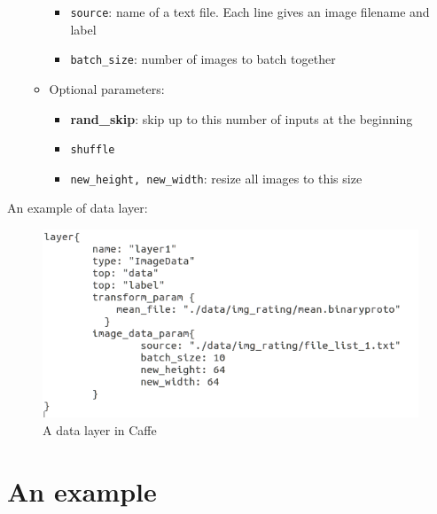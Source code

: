 \begin{itemize}
\begin{itemize}
				\begin{itemize}
					\item \texttt{source}: name of a text file. Each line gives an image filename and label
					\item \texttt{batch\_size}: number of images to batch together
				\end{itemize}
			\item Optional parameters:
				\begin{itemize}
					\item \textbf{rand\_skip}: skip up to this number of inputs at the beginning
					\item \texttt{shuffle}
					\item \texttt{new\_height, new\_width}: resize all images to this size
				\end{itemize}
		\end{itemize}
\end{itemize}
An example of data layer:
\begin{figure}[!h]
	\centering
	\includegraphics[scale=0.65]{images/stdata}
	\caption{A data layer in Caffe}
	\label{figstdata}
\end{figure}
\section{An example}
